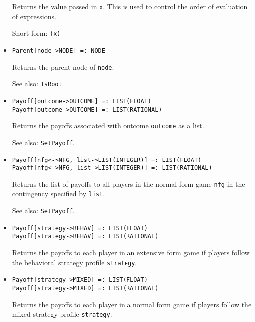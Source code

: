\begin{itemize}
\bd
Returns the value passed in \verb+x+.  This is used to control
the order of evaluation of expressions.
\item
[Short form:] \verb+(x)+
\ed

\item
\protect \large \begin{verbatim}
Parent[node->NODE] =: NODE
\end{verbatim}\normalsize

\bd
Returns the parent node of \verb+node+.
\item
[See also:] {\tt IsRoot}.
\ed

\item
\protect \large \begin{verbatim}
Payoff[outcome->OUTCOME] =: LIST(FLOAT)
Payoff[outcome->OUTCOME] =: LIST(RATIONAL)
\end{verbatim}\normalsize

\bd
Returns the payoffs associated with outcome \verb+outcome+
as a list.
\item
[See also:] {\tt SetPayoff}.
\ed

\item
\protect \large \begin{verbatim}
Payoff[nfg<->NFG, list->LIST(INTEGER)] =: LIST(FLOAT)
Payoff[nfg<->NFG, list->LIST(INTEGER)] =: LIST(RATIONAL)
\end{verbatim}\normalsize

\bd
Returns the list of payoffs to all players in the normal form game
\verb+nfg+ in the contingency specified by \verb+list+.
\item
[See also:] {\tt SetPayoff}.
\ed

\item
\protect \large \begin{verbatim}
Payoff[strategy->BEHAV] =: LIST(FLOAT)
Payoff[strategy->BEHAV] =: LIST(RATIONAL)
\end{verbatim}\normalsize

\bd
Returns the payoffs to each player in an extensive form game
if players follow the behavioral strategy profile \verb+strategy+.
\ed

\item
\protect \large \begin{verbatim}
Payoff[strategy->MIXED] =: LIST(FLOAT)
Payoff[strategy->MIXED] =: LIST(RATIONAL)
\end{verbatim}\normalsize

\bd
Returns the payoffs to each player in a normal form game
if players follow the mixed strategy profile \verb+strategy+.
\ed


\end{itemize}
